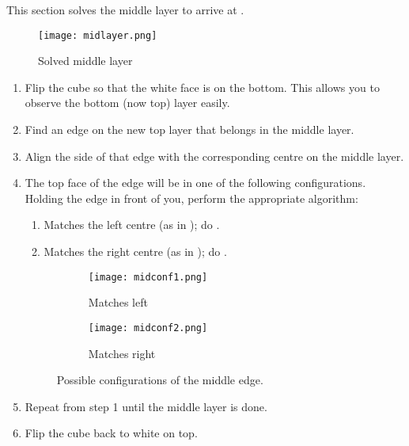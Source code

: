 This section solves the middle layer to arrive at .
\begin{figure}[h]
	\centering
	\texttt{[image: midlayer.png]}
	\caption{Solved middle layer}\label{fig:midlayer}
\end{figure}
\begin{enumerate}
	\item Flip the cube so that the white face is on the bottom. This allows you to observe the bottom (now top) layer easily.
	\item Find an edge on the new top layer that belongs in the middle layer.
	\item Align the side of that edge with the corresponding centre on the middle layer.
	\item The top face of the edge will be in one of the following configurations. Holding the edge in front of you, perform the appropriate algorithm:\begin{enumerate}
		\item Matches the left centre (as in ); do .
		\item Matches the right centre (as in ); do .
	\end{enumerate}
\begin{figure}[h]
	\centering
	\begin{subfigure}[b]{0.3\textwidth}
		\texttt{[image: midconf1.png]}
		\caption{Matches left}\label{fig:midconf1}
	\end{subfigure}
	\begin{subfigure}[b]{0.3\textwidth}
		\texttt{[image: midconf2.png]}
		\caption{Matches right}\label{fig:midconf2}
	\end{subfigure}
	\caption{Possible configurations of the middle edge.}
\end{figure}
	\item Repeat from step 1 until the middle layer is done.
	\item Flip the cube back to white on top.
\end{enumerate}
